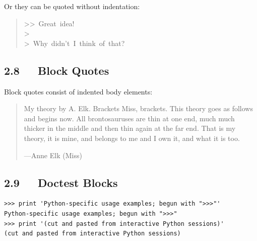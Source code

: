 \documentclass[10pt,a4paper,english]{article}
\begin{document}
Or they can be quoted without indentation:
\begin{quote}{\ttfamily \raggedright \noindent
>{}>~Great~idea!~\\
>~\\
>~Why~didn't~I~think~of~that?
}\end{quote}



\hypertarget{block-quotes}{}
\subsection*{2.8~~~Block Quotes}

Block quotes consist of indented body elements:
\begin{quote}

My theory by A. Elk.  Brackets Miss, brackets.  This theory goes
as follows and begins now.  All brontosauruses are thin at one
end, much much thicker in the middle and then thin again at the
far end.  That is my theory, it is mine, and belongs to me and I
own it, and what it is too.

\begin{flushright}
---Anne Elk (Miss)
\end{flushright}
\end{quote}



\hypertarget{doctest-blocks}{}
\subsection*{2.9~~~Doctest Blocks}
\begin{verbatim}>>> print 'Python-specific usage examples; begun with ">>>"'
Python-specific usage examples; begun with ">>>"
>>> print '(cut and pasted from interactive Python sessions)'
(cut and pasted from interactive Python sessions)\end{verbatim}



\hypertarget{footnotes}{}
\end{document}
